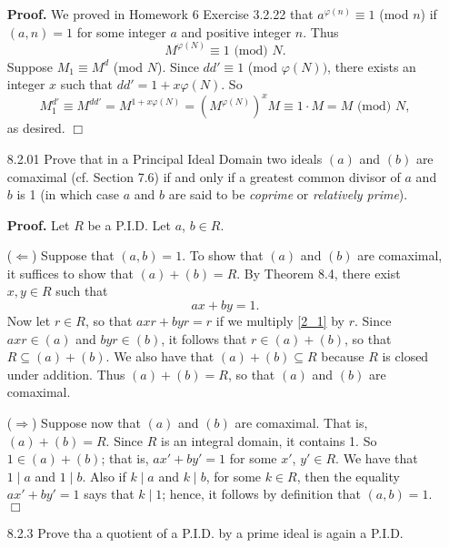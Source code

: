 \documentclass[9pt]{article}
\newcommand{\qed}{\hfill \ensuremath{\Box}}
\begin{document}
\begin{enumerate}
      \textbf{Proof.} We proved in Homework 6 Exercise 3.2.22 that
      $a^{\varphi(n)} \equiv 1$ (mod $n$) if $(a, n) = 1$ for some integer
      $a$ and positive integer $n$. Thus
      $$M^{\varphi(N)} \equiv 1 \text{ (mod) }N.$$
      Suppose $M_1 \equiv M^d$ (mod $N$). Since
      $dd' \equiv 1$ (mod $\varphi(N))$, there exists an integer $x$ such that
      $dd' = 1 + x\varphi(N)$. So
      $$M_1^{d'} \equiv M^{dd'} = M^{1 + x\varphi(N)} = (M^{\varphi(N)})^xM
      \equiv 1 \cdot M = M\text{ (mod) }N,$$
      as desired. \qed
   \item[8.2.01]  Prove that in a Principal Ideal Domain two ideals $(a)$ and
                  $(b)$ are comaximal (cf. Section 7.6) if and only if a
                  greatest common divisor of $a$ and $b$ is 1 (in which case $a$
                  and $b$ are said to be \textit{coprime} or
                  \textit{relatively prime}).

      \textbf{Proof.} Let $R$ be a P.I.D. Let $a$, $b \in R$.

      ($\Leftarrow$) Suppose that $(a, b) = 1$. To show that $(a)$ and $(b)$ are 
      comaximal, it suffices to show that $(a) + (b) = R$. By Theorem 8.4, there
      exist $x, y \in R$ such that
      \begin{equation} \label{2_1}
         ax + by = 1.
      \end{equation}
      Now let $r \in R$, so that $axr + byr = r$ if we multiply \eqref{2_1} by
      $r$. Since $axr \in (a)$ and $byr \in (b)$, it follows that
      $r \in (a) + (b)$, so that $R \subseteq (a) + (b)$. We also have that
      $(a) + (b) \subseteq R$ because $R$ is closed under addition. Thus
      $(a) + (b) = R$, so that $(a)$ and $(b)$ are comaximal.

      ($\Rightarrow$) Suppose now that $(a)$ and $(b)$ are comaximal. That is,
      $(a) + (b) = R$. Since $R$ is an integral domain, it contains 1. So
      $1 \in (a) + (b)$; that is, $ax' + by' = 1$ for some $x'$, $y' \in R$. We
      have that $1 \mid a$ and $1 \mid b$. Also if $k \mid a$ and $k \mid b$,
      for some $k \in R$, then the equality $ax' + by' = 1$ says that
      $k \mid 1$; hence, it follows by definition that $(a, b) = 1$. \qed
   \item[8.2.3]   Prove tha a quotient of a P.I.D. by a prime ideal is again a
                  P.I.D.


\end{enumerate}
\end{document}
